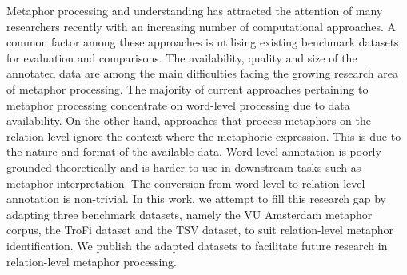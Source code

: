 Metaphor processing and understanding has attracted the attention of many researchers recently with an increasing number of computational approaches. A common factor among these approaches is utilising existing benchmark datasets for evaluation and comparisons. The availability, quality and size of the annotated data are among the main difficulties facing the growing research area of metaphor processing. The majority of current approaches pertaining to metaphor processing concentrate on word-level processing due to data availability. On the other hand, approaches that process metaphors on the relation-level ignore the context where the metaphoric expression. This is due to the nature and format of the available data. Word-level annotation is poorly grounded theoretically and is harder to use in downstream tasks such as metaphor interpretation. The conversion from word-level to relation-level annotation is non-trivial. In this work, we attempt to fill this research gap by adapting three benchmark datasets, namely the VU Amsterdam metaphor corpus, the TroFi dataset and the TSV dataset, to suit relation-level metaphor identification. We publish the adapted datasets to facilitate future research in relation-level metaphor processing.
